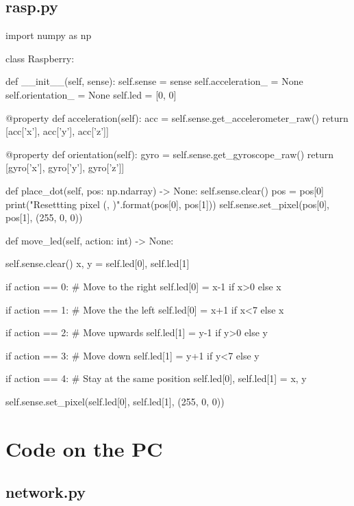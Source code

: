 \subsection{rasp.py}
\label{rasp_code}
\begin{pyverbatim}
import numpy as np


class Raspberry:

    def __init__(self, sense):
        self.sense = sense
        self.acceleration_ = None
        self.orientation_ = None
        self.led = [0, 0]

    @property
    def acceleration(self):
        acc = self.sense.get_accelerometer_raw()
        return [acc['x'], acc['y'], acc['z']]

    @property
    def orientation(self):
        gyro = self.sense.get_gyroscope_raw()
        return [gyro['x'], gyro['y'], gyro['z']]

    def place_dot(self, pos: np.ndarray) -> None:
        self.sense.clear()
        pos = pos[0]
        print("Resettting pixel ({}, {})".format(pos[0], pos[1]))
        self.sense.set_pixel(pos[0], pos[1], (255, 0, 0))

    def move_led(self, action: int) -> None:

        self.sense.clear()
        x, y = self.led[0], self.led[1]

        if action == 0:  # Move to the right
            self.led[0] = x-1 if x>0 else x

        if action == 1:  # Move the the left
            self.led[0] = x+1 if x<7 else x

        if action == 2:  # Move upwards
            self.led[1] = y-1 if y>0 else y

        if action == 3:  # Move down
            self.led[1] = y+1 if y<7 else y
        
        if action == 4:  # Stay at the same position
            self.led[0], self.led[1] = x, y
        
        self.sense.set_pixel(self.led[0], self.led[1], (255, 0, 0))

\end{pyverbatim}

\section{Code on the PC}
\subsection{network.py}
\label{pc_code}

